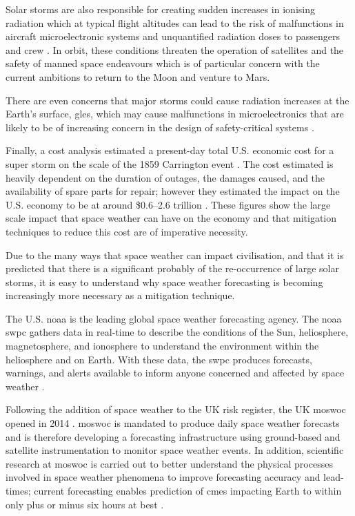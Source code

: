 Solar storms are also responsible for creating sudden increases in ionising radiation which at typical flight altitudes can lead to the risk of malfunctions in aircraft microelectronic systems and unquantified radiation doses to passengers and crew \citep{cannon_extreme_2013}. In orbit, these conditions threaten the operation of satellites and the safety of manned space endeavours which is of particular concern with the current ambitions to return to the Moon and venture to Mars. 

There are even concerns that major storms could cause radiation increases at the Earth's surface, \glspl{gle}, which may cause malfunctions in microelectronics that are likely to be of increasing concern in the design of safety-critical systems \citep{cannon_extreme_2013}. 

Finally, a cost analysis estimated a present-day total U.S. economic cost for a super storm on the scale of the 1859 Carrington event \citep{homeier_solar_2013}. The cost estimated is heavily dependent on the duration of outages, the damages caused, and the availability of spare parts for repair; however they estimated the impact on the U.S. economy to be at around \$0.6--2.6 trillion \citep{homeier_solar_2013}. These figures show the large scale impact that space weather can have on the economy and that mitigation techniques to reduce this cost are of imperative necessity.

Due to the many ways that space weather can impact civilisation, and that it is predicted that there is a significant probably of the re-occurrence of large solar storms, it is easy to understand why space weather forecasting is becoming increasingly more necessary as a mitigation technique. 

The U.S. \gls{noaa} is the leading global space weather forecasting agency. The \gls{noaa} \gls{swpc} gathers data in real-time to describe the conditions of the Sun, heliosphere, magnetosphere, and ionosphere to understand the environment within the heliosphere and on Earth. With these data, the \gls{swpc} produces forecasts, warnings, and alerts available to inform anyone concerned and affected by space weather \citep{noaa_noaa_2018}. 

Following the addition of space weather to the UK risk register, the UK \gls{moswoc} opened in 2014 \citep{bis_space_2015}. \gls{moswoc} is mandated to produce daily space weather forecasts and is therefore developing a forecasting infrastructure using ground-based and satellite instrumentation to monitor space weather events. In addition, scientific research at \gls{moswoc} is carried out to better understand the physical processes involved in space weather phenomena to improve forecasting accuracy and lead-times; current forecasting enables prediction of \glspl{cme} impacting Earth to within only plus or minus six hours at best \citep{metoffice_space_2013}.

